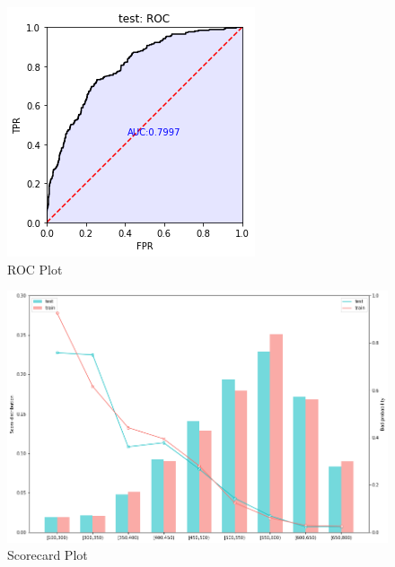 \begin{figure}[!ht]
	\centering
	\includegraphics[scale=0.90]{figs/roc_plot.png}
	\caption{ROC Plot \label{roc_plot}}
\end{figure}

\begin{landscape}
\begin{figure}[!ht]
\begin{center}
	\includegraphics[scale=0.75]{figs/scorecard_plot.png}
	\caption{Scorecard Plot \label{scorecard_plot}}
\end{center}
\end{figure}
\end{landscape}

